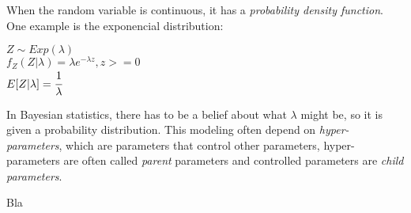 \documentclass{article}
\begin{document}
When the random variable is continuous, it has a \textit{probability density function}. One example is the exponencial distribution:\\

\begin{center}
	$Z \sim Exp(\lambda)$\\
	\vspace{0.2cm}
	$f_{Z}(Z|\lambda) = \lambda e^{-\lambda z}, z >= 0$\\
	\vspace{0.2cm}
	$E[Z|\lambda] = \cfrac{1}{\lambda}$
\end{center}

In Bayesian statistics, there has to be a belief about what $\lambda$ might be, so it is given a probability distribution. This modeling often depend on \textit{hyper-parameters}, which are parameters that control other parameters, hyper-parameters are often called \textit{parent} parameters and controlled parameters are \textit{child parameters}.




Bla
\end{document}
